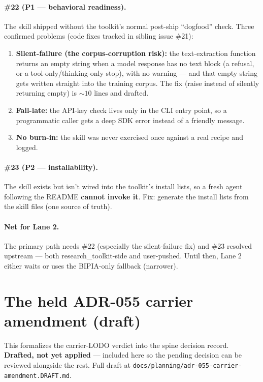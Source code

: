 \documentclass[11pt,parskip=half-]{scrartcl}
\newcommand{\code}[1]{\texttt{\small #1}}
\begin{document}
\paragraph{\#22 (P1 --- behavioral readiness).} The skill shipped without the toolkit's normal
post-ship ``dogfood'' check. Three confirmed problems (code fixes tracked in sibling issue \#21):
\begin{enumerate}[leftmargin=1.4em]
  \item \textbf{Silent-failure (the corpus-corruption risk):} the text-extraction function returns an
    empty string when a model response has no text block (a refusal, or a tool-only/thinking-only stop),
    with no warning --- and that empty string gets written straight into the training corpus. The fix
    (raise instead of silently returning empty) is ${\sim}10$ lines and drafted.
  \item \textbf{Fail-late:} the API-key check lives only in the CLI entry point, so a programmatic caller
    gets a deep SDK error instead of a friendly message.
  \item \textbf{No burn-in:} the skill was never exercised once against a real recipe and logged.
\end{enumerate}

\paragraph{\#23 (P2 --- installability).} The skill exists but isn't wired into the toolkit's install
lists, so a fresh agent following the README \textbf{cannot invoke it}. Fix: generate the install lists
from the skill files (one source of truth).

\paragraph{Net for Lane 2.} The primary path needs \#22 (especially the silent-failure fix) and \#23
resolved upstream --- both research\_toolkit-side and user-pushed. Until then, Lane 2 either waits or
uses the BIPIA-only fallback (narrower).

\appendix
\section{The held ADR-055 carrier amendment (draft)}\label{app:adr}
This formalizes the carrier-LODO verdict into the spine decision record. \textbf{Drafted, not yet
applied} --- included here so the pending decision can be reviewed alongside the rest. Full draft at
\code{docs/planning/adr-055-carrier-amendment.DRAFT.md}.
\end{document}
